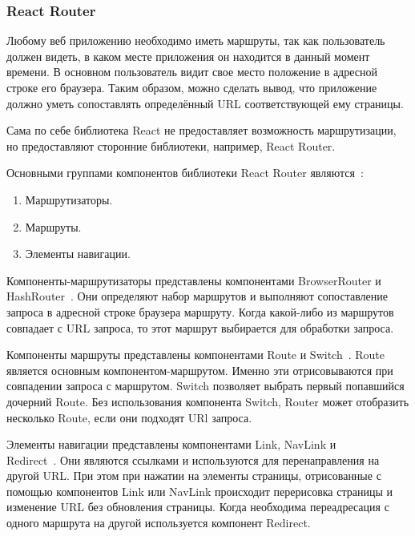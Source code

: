 \subsubsection{React Router}

Любому веб приложению необходимо иметь маршруты, так как пользователь должен видеть, в каком месте приложения он находится в данный момент времени. В основном пользователь видит свое место положение в адресной строке его браузера. Таким образом, можно сделать вывод, что приложение должно уметь сопоставлять определённый URL соответствующей ему страницы.

Сама по себе библиотека React не предоставляет возможность маршрутизации, но предоставляют сторонние библиотеки, например, React Router.

Основными группами компонентов библиотеки React Router являются~\cite{react-router}:

\begin{enumerate}
  \item Маршрутизаторы.
  \item Маршруты.
  \item Элементы навигации.
\end{enumerate}

Компоненты-маршрутизаторы представлены компонентами BrowserRouter и HashRouter~\cite{react-router}. Они определяют набор маршрутов и выполняют сопоставление запроса в адресной строке браузера маршруту. Когда какой-либо из маршрутов совпадает с URL запроса, то этот маршрут выбирается для обработки запроса.

Компоненты маршруты представлены компонентами Route и Switch~\cite{react-router}. Route является основным компонентом-маршрутом. Именно эти отрисовываются при совпадении запроса с маршрутом. Switch позволяет выбрать первый попавшийся дочерний Route. Без использования компонента Switch, Router может отобразить несколько Route, если они подходят URl запроса.

Элементы навигации представлены компонентами Link, NavLink и\\Redirect~\cite{react-router}. Они являются ссылками и используются для перенаправления на другой URL. При этом при нажатии на элементы страницы, отрисованные с помощью компонентов Link или NavLink происходит перерисовка страницы и изменение URL без обновления страницы. Когда необходима переадресация с одного маршрута на другой используется компонент Redirect.

